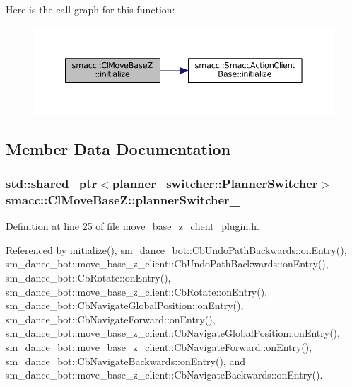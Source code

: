 Here is the call graph for this function\+:
\nopagebreak
\begin{figure}[H]
\begin{center}
\leavevmode
\includegraphics[width=350pt]{classsmacc_1_1ClMoveBaseZ_a0eb8e4a0e80456fa534bbef7b2e330a5_cgraph}
\end{center}
\end{figure}




\subsection{Member Data Documentation}
\subsubsection[{\texorpdfstring{planner\+Switcher\+\_\+}{plannerSwitcher_}}]{\setlength{\rightskip}{0pt plus 5cm}std\+::shared\+\_\+ptr$<${\bf planner\+\_\+switcher\+::\+Planner\+Switcher}$>$ smacc\+::\+Cl\+Move\+Base\+Z\+::planner\+Switcher\+\_\+}\hypertarget{classsmacc_1_1ClMoveBaseZ_a712e0df77c9629930e03cbb4c539b485}{}\label{classsmacc_1_1ClMoveBaseZ_a712e0df77c9629930e03cbb4c539b485}


Definition at line 25 of file move\+\_\+base\+\_\+z\+\_\+client\+\_\+plugin.\+h.



Referenced by initialize(), sm\+\_\+dance\+\_\+bot\+::\+Cb\+Undo\+Path\+Backwards\+::on\+Entry(), sm\+\_\+dance\+\_\+bot\+::move\+\_\+base\+\_\+z\+\_\+client\+::\+Cb\+Undo\+Path\+Backwards\+::on\+Entry(), sm\+\_\+dance\+\_\+bot\+::\+Cb\+Rotate\+::on\+Entry(), sm\+\_\+dance\+\_\+bot\+::move\+\_\+base\+\_\+z\+\_\+client\+::\+Cb\+Rotate\+::on\+Entry(), sm\+\_\+dance\+\_\+bot\+::\+Cb\+Navigate\+Global\+Position\+::on\+Entry(), sm\+\_\+dance\+\_\+bot\+::\+Cb\+Navigate\+Forward\+::on\+Entry(), sm\+\_\+dance\+\_\+bot\+::move\+\_\+base\+\_\+z\+\_\+client\+::\+Cb\+Navigate\+Global\+Position\+::on\+Entry(), sm\+\_\+dance\+\_\+bot\+::move\+\_\+base\+\_\+z\+\_\+client\+::\+Cb\+Navigate\+Forward\+::on\+Entry(), sm\+\_\+dance\+\_\+bot\+::\+Cb\+Navigate\+Backwards\+::on\+Entry(), and sm\+\_\+dance\+\_\+bot\+::move\+\_\+base\+\_\+z\+\_\+client\+::\+Cb\+Navigate\+Backwards\+::on\+Entry().



